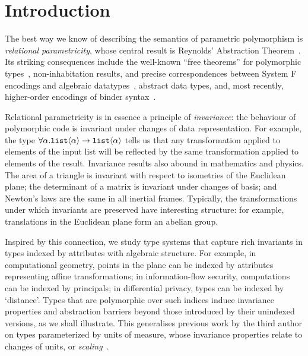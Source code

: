 \documentclass{sigplanconf}
\newcommand{\tyPrim}[2]{\textup{\texttt{#1}}\langle #2 \rangle}
\theoremstyle{examplestyle}
\theoremstyle{restatementstyle}
\begin{document}
\section{Introduction}
\label{sec:introduction}
The best way we know of describing the semantics of parametric
polymorphism is \emph{relational parametricity}, whose central result
is Reynolds' Abstraction Theorem~\cite{reynolds83types}. Its striking
consequences include the well-known ``free theorems'' for polymorphic
types~\cite{wadler89theorems}, non-inhabitation results, and precise
correspondences between System F encodings and algebraic
datatypes~\cite{PittsAM:parpoe}, abstract data types, and, most
recently, higher-order encodings of binder
syntax~\cite{syntaxforfree}.

Relational parametricity is in essence a principle of
\emph{invariance}: the behaviour of polymorphic code is invariant
under changes of data representation. For example, the type
$\forall\alpha.\tyPrim{list}\alpha\to\tyPrim{list}\alpha$
tells us that any transformation applied to elements of
the input list will be reflected by the same transformation applied
to elements of the result. 
Invariance results also abound in
mathematics and physics. The area of a triangle is invariant with
respect to isometries of the Euclidean plane; the determinant of a
matrix is invariant under changes of basis; and Newton's laws are the
same in all inertial frames. Typically, the 
transformations under which invariants are preserved have interesting structure: 
for example, translations in
the Euclidean plane form an abelian group.

Inspired by this connection, we study type systems that
capture rich invariants in types indexed by attributes with
algebraic structure.  For example, in computational geometry, points
in the plane can be indexed by attributes representing affine
transformations; in information-flow security, computations can be
indexed by principals; in differential privacy, types can be indexed
by `distance'. Types that are polymorphic over such indices induce
invariance properties and abstraction barriers beyond those introduced
by their unindexed versions, as we shall illustrate.  This generalises
previous work by the third author on types parameterized by
units of measure, whose invariance properties relate to changes of
units, or \emph{scaling}~\cite{kennedy97relational}.
\end{document}
